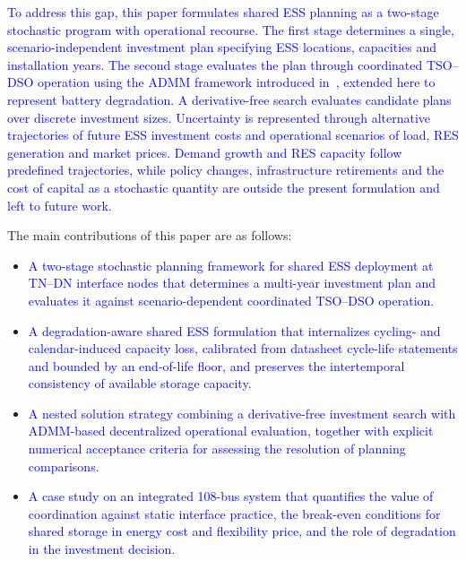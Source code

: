 \documentclass[preprint,12pt]{elsarticle}
\begin{document}
\textcolor{blue}{
    To address this gap, this paper formulates shared ESS planning as a two-stage stochastic program with operational recourse. The first stage determines a single, scenario-independent investment plan specifying ESS locations, capacities and installation years. The second stage evaluates the plan through coordinated TSO--DSO operation using the ADMM framework introduced in~\cite{simoes_2023}, extended here to represent battery degradation. A derivative-free search evaluates candidate plans over discrete investment sizes. Uncertainty is represented through alternative trajectories of future ESS investment costs and operational scenarios of load, RES generation and market prices.
    Demand growth and RES capacity follow predefined trajectories, while policy changes, infrastructure retirements and the cost of capital as a stochastic quantity are outside the present formulation and left to future work.
}

The main contributions of this paper are as follows:
\begin{itemize}
    \item \textcolor{blue}{A two-stage stochastic planning framework for shared ESS deployment at TN--DN interface nodes that determines a multi-year investment plan and evaluates it against scenario-dependent coordinated TSO--DSO operation.}
    \item \textcolor{blue}{A degradation-aware shared ESS formulation that internalizes cycling- and calendar-induced capacity loss, calibrated from datasheet cycle-life statements and bounded by an end-of-life floor, and preserves the intertemporal consistency of available storage capacity.}
    \item \textcolor{blue}{A nested solution strategy combining a derivative-free investment search with ADMM-based decentralized operational evaluation, together with explicit numerical acceptance criteria for assessing the resolution of planning comparisons.}
    \item \textcolor{blue}{A case study on an integrated 108-bus system that quantifies the value of coordination against static interface practice, the break-even conditions for shared storage in energy cost and flexibility price, and the role of degradation in the investment decision.}
\end{itemize}

\end{document}
